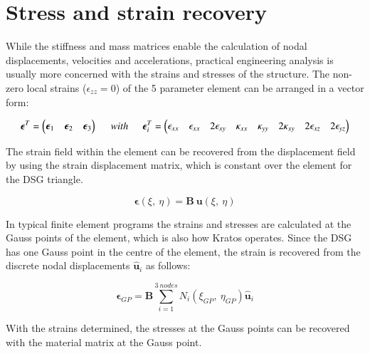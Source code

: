 \section{Stress and strain recovery}

While the stiffness and mass matrices enable the calculation of nodal displacements, velocities and accelerations, practical engineering analysis is usually more concerned with the strains and stresses of the structure. The non-zero local strains ($\epsilon_{zz} = 0$) of the 5 parameter element can be arranged in a vector form:

\begin{equation} 
\boldsymbol{\epsilon}^T = \begin{pmatrix}
\boldsymbol{\epsilon}_1 & \boldsymbol{\epsilon}_2 & \boldsymbol{\epsilon}_3
\end{pmatrix}
\hspace{5mm}
with
\hspace{5mm}
\boldsymbol{\epsilon}^T_i = \begin{pmatrix}
\epsilon_{xx} & \epsilon_{xx} & 2\epsilon_{xy} & \kappa_{xx} & \kappa_{yy} & 2\kappa_{xy} & 2\epsilon_{xz} & 2\epsilon_{yz}
\end{pmatrix}
\label{eqt18}
\end{equation}

The strain field within the element can be recovered from the displacement field by using the strain displacement matrix, which is constant over the element for the DSG triangle.

\begin{equation} 
\boldsymbol{\epsilon}(\xi,\ \eta) = \mathbf{B}\ \mathbf{u}(\xi,\ \eta)
\label{eqt19}
\end{equation}

In typical finite element programs the strains and stresses are calculated at the Gauss points of the element, which is also how Kratos operates. Since the DSG has one Gauss point in the centre of the element, the strain is recovered from the discrete nodal displacements $\hat{\mathbf{u}}_i$ as follows:

\begin{equation} 
\boldsymbol{\epsilon}_{GP} = \mathbf{B} \sum_{i=1}^{3\ nodes} N_i(\xi_{GP},\ \eta_{GP}) \hat{\mathbf{u}}_i
\label{eqt20}
\end{equation}

With the strains determined, the stresses at the Gauss points can be recovered with the material matrix at the Gauss point.

